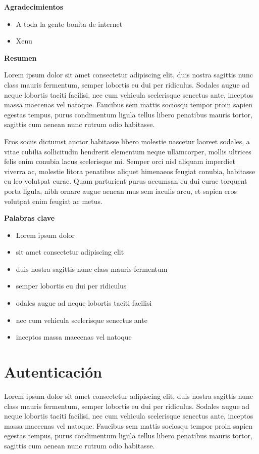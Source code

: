 \documentclass{article}
\begin{document}
{\bfseries\LARGE Agradecimientos \par}
\begin{itemize}
  \item A toda la gente bonita de internet
  \item Xenu
\end{itemize}
\newpage

{\bfseries\LARGE Resumen \par}
Lorem ipsum dolor sit amet consectetur adipiscing elit, duis nostra sagittis nunc class mauris fermentum, semper lobortis eu dui per ridiculus. Sodales augue ad neque lobortis taciti facilisi, nec cum vehicula scelerisque senectus ante, inceptos massa maecenas vel natoque. Faucibus sem mattis sociosqu tempor proin sapien egestas tempus, purus condimentum ligula tellus libero penatibus mauris tortor, sagittis cum aenean nunc rutrum odio habitasse.

Eros sociis dictumst auctor habitasse libero molestie nascetur laoreet sodales, a vitae cubilia sollicitudin hendrerit elementum neque ullamcorper, mollis ultrices felis enim conubia lacus scelerisque mi. Semper orci nisl aliquam imperdiet viverra ac, molestie litora penatibus aliquet himenaeos feugiat conubia, habitasse eu leo volutpat curae. Quam parturient purus accumsan eu dui curae torquent porta ligula, nibh ornare augue aenean mus sem iaculis arcu, et sapien eros volutpat enim feugiat ac metus.
\newpage

{\bfseries\LARGE Palabras clave \par}
\begin{itemize}
    \item Lorem ipsum dolor
    \item sit amet consectetur adipiscing elit
    \item duis nostra sagittis nunc class mauris fermentum
    \item semper lobortis eu dui per ridiculus
    \item odales augue ad neque lobortis taciti facilisi
    \item nec cum vehicula scelerisque senectus ante
    \item inceptos massa maecenas vel natoque
\end{itemize}
\newpage

{\Large %
\tableofcontents
}\newpage

\section{Autenticación}
Lorem ipsum dolor sit amet consectetur adipiscing elit, duis nostra sagittis nunc class mauris fermentum, semper lobortis eu dui per ridiculus. Sodales augue ad neque lobortis taciti facilisi, nec cum vehicula scelerisque senectus ante, inceptos massa maecenas vel natoque. Faucibus sem mattis sociosqu tempor proin sapien egestas tempus, purus condimentum ligula tellus libero penatibus mauris tortor, sagittis cum aenean nunc rutrum odio habitasse.
\end{document}

